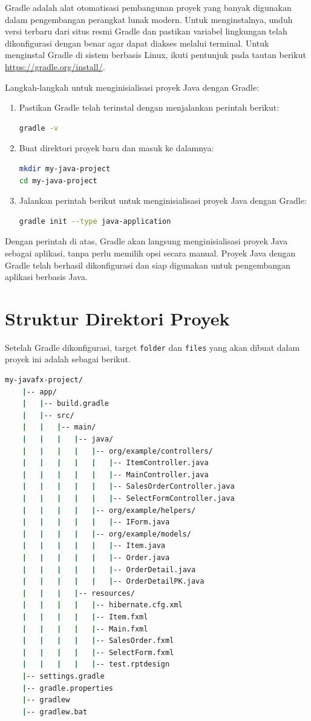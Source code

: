 Gradle adalah alat otomatisasi pembangunan proyek yang banyak digunakan dalam pengembangan perangkat lunak modern. Untuk menginstalnya, unduh versi terbaru dari situs resmi Gradle dan pastikan variabel lingkungan telah dikonfigurasi dengan benar agar dapat diakses melalui terminal. Untuk menginstal Gradle di sistem berbasis Linux, ikuti pentunjuk pada tautan berikut \url{https://gradle.org/install/}.


Langkah-langkah untuk menginisialisasi proyek Java dengan Gradle:

\begin{enumerate}
\item Pastikan Gradle telah terinstal dengan menjalankan perintah berikut:
\begin{lstlisting}[language=bash]
gradle -v
\end{lstlisting}

\item Buat direktori proyek baru dan masuk ke dalamnya:
\begin{lstlisting}[language=bash]
mkdir my-java-project
cd my-java-project
\end{lstlisting}

\item Jalankan perintah berikut untuk menginisialisasi proyek Java dengan Gradle:
\begin{lstlisting}[language=bash]
gradle init --type java-application
\end{lstlisting}
\end{enumerate}

Dengan perintah di atas, Gradle akan langsung menginisialisasi proyek Java sebagai aplikasi, tanpa perlu memilih opsi secara manual. Proyek Java dengan Gradle telah berhasil dikonfigurasi dan siap digunakan untuk pengembangan aplikasi berbasis Java.

\section{Struktur Direktori Proyek}
Setelah Gradle dikonfigurasi, target \texttt{folder} dan \texttt{files} yang akan dibuat dalam proyek ini adalah sebagai berikut.

\begin{lstlisting}[language=bash]
	my-javafx-project/
	|-- app/
	|   |-- build.gradle
	|   |-- src/
	|   |   |-- main/
	|   |   |   |-- java/
	|   |   |   |   |-- org/example/controllers/
	|   |   |   |   |   |-- ItemController.java
	|   |   |   |   |   |-- MainController.java
	|   |   |   |   |   |-- SalesOrderController.java
	|   |   |   |   |   |-- SelectFormController.java
	|   |   |   |   |-- org/example/helpers/
	|   |   |   |   |   |-- IForm.java
	|   |   |   |   |-- org/example/models/
	|   |   |   |   |   |-- Item.java
	|   |   |   |   |   |-- Order.java
	|   |   |   |   |   |-- OrderDetail.java
	|   |   |   |   |   |-- OrderDetailPK.java
	|   |   |   |-- resources/
	|   |   |   |   |-- hibernate.cfg.xml
	|   |   |   |   |-- Item.fxml
	|   |   |   |   |-- Main.fxml
	|   |   |   |   |-- SalesOrder.fxml
	|   |   |   |   |-- SelectForm.fxml
	|   |   |   |   |-- test.rptdesign
	|-- settings.gradle
	|-- gradle.properties
	|-- gradlew
	|-- gradlew.bat
\end{lstlisting}


